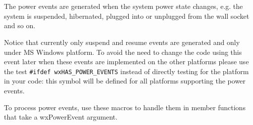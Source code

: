 
\section{}\label{wxpowerevent}

The power events are generated when the system power state changes, e.g. the
system is suspended, hibernated, plugged into or unplugged from the wall socket
and so on.

Notice that currently only suspend and resume events are generated and only
under MS Windows platform. To avoid the need to change the code using this
event later when these events are implemented on the other platforms please use
the test \texttt{#ifdef wxHAS\_POWER\_EVENTS} instead of directly testing for
the platform in your code: this symbol will be defined for all platforms
supporting the power events.


To process power events, use these macros to handle them in
member functions that take a wxPowerEvent argument.

\twocolwidtha{9cm}
\begin{twocollist}\itemsep=0pt
\end{twocollist}%


